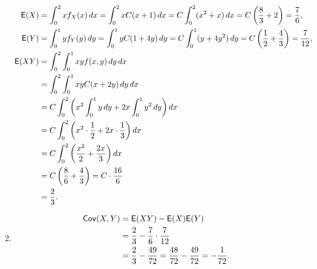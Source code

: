 \documentclass[12pt]{article}
\newcommand{\E}{{\sf E}}
\newcommand{\Cov}{{\sf Cov}}
\newenvironment{problem}[2][Problem]{\begin{trivlist}
\item[\hskip \labelsep {\bfseries #1}\hskip \labelsep {\bfseries #2.}]}
{\end{trivlist}}
\begin{document}
\begin{problem}{5}
\begin{enumerate}
    \begin{align*}
      \E(X) &= \int_0^2 x f_X(x) \, dx = \int_0^2 x C(x + 1) \, dx 
      = C \int_0^2 (x^2 + x) \, dx = C \left(\frac{8}{3} + 2\right) 
      = \frac{7}{6}, \\
      \E(Y) &= \int_0^1 y f_Y(y) \, dy = \int_0^1 y C(1 + 4y) \, dy 
      = C \int_0^1 (y + 4y^2) \, dy = C \left(\frac{1}{2} + \frac{4}{3}\right) 
      = \frac{7}{12},\\
      \E(XY) &= \int_0^2 \int_0^1 xy f(x,y) \, dy \, dx \\
      &= \int_0^2 \int_0^1 xy C(x + 2y) \, dy \, dx \\
      &= C \int_0^2 \left( x^2 \int_0^1 y \, dy + 2x \int_0^1 y^2 \, dy \right) dx \\
      &= C \int_0^2 \left( x^2 \cdot \frac{1}{2} + 2x \cdot \frac{1}{3} \right) dx \\
      &= C \int_0^2 \left( \frac{x^2}{2} + \frac{2x}{3} \right) dx \\
      &= C \left( \frac{8}{6} + \frac{4}{3} \right) = C \cdot \frac{16}{6} \\
      &= \frac{2}{3}.
    \end{align*}
    \item
    \begin{align*}
      \Cov(X, Y) &= \E(XY) - \E(X) \E(Y) \\
      &= \frac{2}{3} - \frac{7}{6} \cdot \frac{7}{12} \\
      &= \frac{2}{3} - \frac{49}{72} = \frac{48}{72} - \frac{49}{72} 
      = -\frac{1}{72}.
    \end{align*}
  \end{enumerate}
\end{problem}
\end{document}
